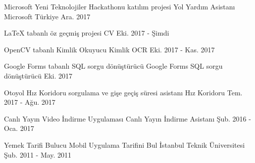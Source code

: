 \begin{cventries}
  \cventry
    {Microsoft Yeni Teknolojiler Hackathonu katılım projesi} %
    {Yol Yardım Asistanı} %
    {Microsoft Türkiye} %
    {Ara. 2017} %
    {}

  \cventry
    {LaTeX tabanlı öz geçmiş projesi} %
    {CV} %
    {} %
    {Eki. 2017 - Şimdi} %
    {}

  \cventry
    {OpenCV tabanlı Kimlik Okuyucu} %
    {Kimlik OCR} %
    {} %
    {Eki. 2017 - Kas. 2017} %
    {}

  \cventry
    {Google Forms tabanlı SQL sorgu dönüştürücü} %
    {Google Forms SQL sorgu dönüştürücü} %
    {} %
    {Eki. 2017} %
    {}

  \cventry
    {Otoyol Hız Koridoru sorgulama ve gişe geçiş süresi asistanı} %
    {Hız Koridoru} %
    {} %
    {Tem. 2017 - Ağu. 2017} %
    {}

  \cventry
    {Canlı Yayın Video İndirme Uygulaması} %
    {Canlı Yayın İndirme Asistanı} %
    {} %
    {Şub. 2016 - Oca. 2017} %
    {}

  \cventry
    {Yemek Tarifi Bulucu Mobil Uygulama} %
    {Tarifini Bul} %
    {İstanbul Teknik Üniversitesi} %
    {Şub. 2011 - May. 2011} %
    {}

\end{cventries}
